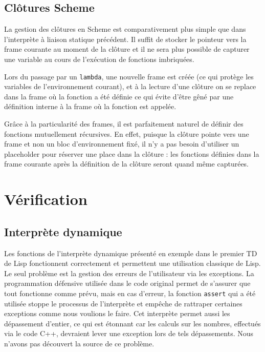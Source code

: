 \documentclass[a4paper,11pt]{article}
\begin{document}
\subsection{Clôtures Scheme}

La gestion des clôtures en Scheme est comparativement plus simple que dans
l'interprète à liaison statique précédent. Il suffit de stocker le pointeur
vers la frame courante au moment de la clôture et il ne sera plus possible de
capturer une variable au cours de l'exécution de fonctions imbriquées.

Lors du passage par un \texttt{lambda}, une nouvelle frame est créée (ce qui
protège les variables de l'environnement courant), et à la lecture d'une clôture
on se replace dans la frame où la fonction a été définie ce qui évite d'être
gêné par une définition interne à la frame où la fonction est appelée.

Grâce à la particularité des frames, il est parfaitement naturel de définir des
fonctions mutuellement récursives. En effet, puisque la clôture pointe vers une
frame et non un bloc d'environnement fixé, il n'y a pas besoin d'utiliser un
placeholder pour réserver une place dans la clôture : les fonctions définies
dans la frame courante après la définition de la clôture seront quand même
capturées.

\section{Vérification}
 
 \subsection{Interprète dynamique}

 Les fonctions de l'interprète dynamique présenté en exemple dans le premier TD
 de Lisp fonctionnent correctement et permettent 
 une utilisation classique de Lisp.  
 Le seul problème est la gestion des erreurs de 
 l'utilisateur via les exceptions. La programmation défensive utilisée dans le 
 code original permet de s'assurer que tout fonctionne comme prévu, mais en cas 
 d'erreur, la fonction \texttt{assert} qui a été utilisée stoppe le processus de 
 l'interprète et empêche de rattraper certaines exceptions comme nous voulions le faire.
 Cet interprète permet aussi les dépassement d'entier, ce qui est étonnant car 
 les calculs sur les nombres, effectués via le code C++, devraient lever une 
 exception lors de tels dépassements. Nous n'avons pas découvert la source de 
 ce problème.
 
\end{document}
